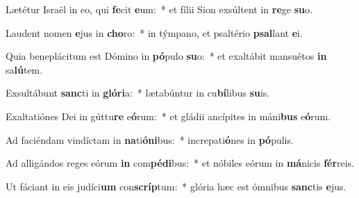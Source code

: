 \item Lætétur Israël in eo, qui \textbf{fe}cit \textbf{e}um:~* et fílii Sion exsúltent in \textbf{re}ge \textbf{su}o.
\item Laudent nomen \textbf{e}jus in \textbf{cho}ro:~* in týmpano, et psaltério \textbf{psal}lant \textbf{e}i.
\item Quia beneplácitum est Dómino in \textbf{pó}pulo \textbf{su}o:~* et exaltábit mansuétos \textbf{in} sa\textbf{lú}tem.
\item Exsultábunt \textbf{sanc}ti in \textbf{gló}\textbf{ri}a:~* lætabúntur in cu\textbf{bí}libus \textbf{su}is.
\item Exaltatiónes Dei in gúttu\textbf{re} e\textbf{ó}rum:~* et gládii ancípites in máni\textbf{bus} e\textbf{ó}rum.
\item Ad faciéndam vindíctam in \textbf{na}ti\textbf{ó}\textbf{ni}bus:~* increpati\textbf{ó}nes in \textbf{pó}pulis.
\item Ad alligándos reges eórum \textbf{in} com\textbf{pé}\textbf{di}bus:~* et nóbiles eórum in \textbf{má}nicis \textbf{fér}reis.
\item Ut fáciant in eis judíci\textbf{um} con\textbf{scríp}tum:~* glória hæc est ómnibus \textbf{sanc}tis \textbf{e}jus.
